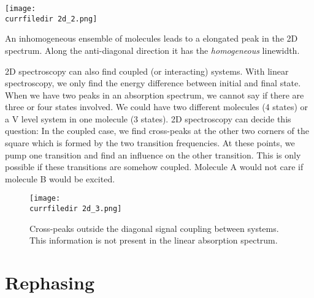 \begin{marginfigure}
\texttt{[image: \\currfiledir 2d\_2.png]}
\caption{An inhomogeneous ensemble of molecules leads to a elongated peak in the 2D spectrum. Along the anti-diagonal direction it has the \emph{homogeneous} linewidth.}
\label{fig_2d_inhom}
\end{marginfigure}



2D spectroscopy can also find coupled (or interacting) systems. With linear spectroscopy, we only find the energy difference between initial and final state. When we have two peaks in an absorption spectrum, we cannot say if there are three or four states involved. We could have two  different molecules (4 states) or a V level system in one molecule (3 states). 2D spectroscopy can decide this question: In the coupled case, we find cross-peaks at the  other two corners  of the square which is formed by the two transition frequencies. At these points, we pump one transition and find an influence on the other transition. This is only possible if these transitions are somehow coupled. Molecule A would not care if molecule B would be excited.

\begin{figure}
\texttt{[image: \\currfiledir 2d\_3.png]}
\caption{Cross-peaks outside the diagonal signal coupling between systems. This information is not present in the linear absorption spectrum.}
\label{fig_2d_crosspeak}
\end{figure}


\section{Rephasing}


